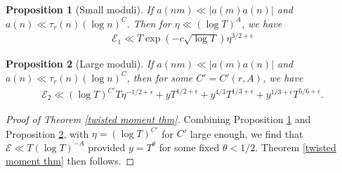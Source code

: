 \documentclass[oneside, 12pt]{amsart}
\newtheorem{prop}{Proposition}
\theoremstyle{definition}
\newcommand{\mc}{\mathcal}
\begin{document}
\begin{prop}[Small moduli]\label{E1}
If $a(nm)\ll |a(m)a(n)|$ and $a(n)\ll \tau_r(n)(\log n)^C$.	Then for $\eta\ll (\log T)^{A}$, we have
	\begin{align}
	\mathcal{E}_1\ll T\exp(-c\sqrt{\log T})\eta^{3/2+\epsilon}
	\end{align}
\end{prop}

\begin{prop}[Large moduli]\label{E2}
	If $a(nm)\ll |a(m)a(n)|$ and $a(n)\ll \tau_r(n)(\log n)^C$, then for some $C'=C'(r, A)$, we have
	\begin{align}
	\mathcal{E}_2\ll (\log T)^{C'} T\eta^{-1/2+\epsilon}+ yT^{1/2+\epsilon}+ y^{4/3}T^{1/3+\epsilon}+y^{1/3+\epsilon}T^{5/6+\epsilon}.
	\end{align}
\end{prop}
\begin{proof}[Proof of Theorem \ref{twisted moment thm}]
	Combining Proposition \ref{E1} and Proposition \ref{E2}, with $\eta=(\log T)^{C'}$ for $C'$ large enough, we find that $\mc{E}\ll T(\log T)^{-A}$ provided $y=T^{\theta}$ for some fixed $\theta<1/2$. Theorem \ref{twisted moment thm} then follows.
\end{proof}





\end{document}

